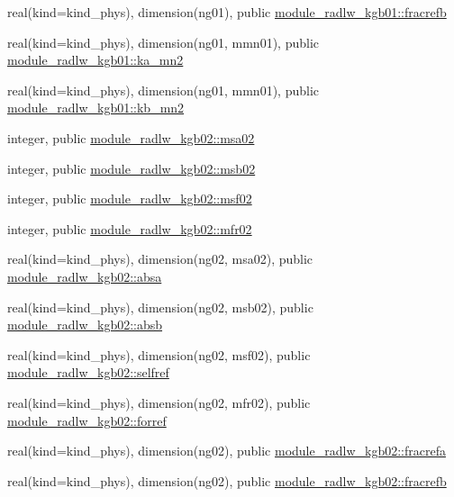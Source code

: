 \begin{DoxyCompactItemize}
\item 
real(kind=kind\+\_\+phys), dimension(ng01), public \hyperlink{group__module__radlw__main_ga19b6a3893965817e82c77bee1de536cd}{module\+\_\+radlw\+\_\+kgb01\+::fracrefb}
\item 
real(kind=kind\+\_\+phys), dimension(ng01, mmn01), public \hyperlink{group__module__radlw__main_ga0a4f08c625f2f25f132200811af42331}{module\+\_\+radlw\+\_\+kgb01\+::ka\+\_\+mn2}
\item 
real(kind=kind\+\_\+phys), dimension(ng01, mmn01), public \hyperlink{group__module__radlw__main_gac357df5f66a7e384e22db58203ac294a}{module\+\_\+radlw\+\_\+kgb01\+::kb\+\_\+mn2}
\item 
integer, public \hyperlink{namespacemodule__radlw__kgb02_a370b514d7834ac2a22d245f118882bf4}{module\+\_\+radlw\+\_\+kgb02\+::msa02}
\item 
integer, public \hyperlink{group__module__radlw__main_ga03e70b84fd16795104a3fb7b425af70c}{module\+\_\+radlw\+\_\+kgb02\+::msb02}
\item 
integer, public \hyperlink{group__module__radlw__main_ga99b728d38d664afc203303563541ab5c}{module\+\_\+radlw\+\_\+kgb02\+::msf02}
\item 
integer, public \hyperlink{group__module__radlw__main_ga2973c2e9220e85b74f0b251c896aa837}{module\+\_\+radlw\+\_\+kgb02\+::mfr02}
\item 
real(kind=kind\+\_\+phys), dimension(ng02, msa02), public \hyperlink{group__module__radlw__main_ga46db893d4456b2d867130bb208cb2206}{module\+\_\+radlw\+\_\+kgb02\+::absa}
\item 
real(kind=kind\+\_\+phys), dimension(ng02, msb02), public \hyperlink{group__module__radlw__main_gacf34f9255586c9ed5ac5370db5b63c14}{module\+\_\+radlw\+\_\+kgb02\+::absb}
\item 
real(kind=kind\+\_\+phys), dimension(ng02, msf02), public \hyperlink{group__module__radlw__main_gaddb071e93b4ff49ba1f1c4d102e275f1}{module\+\_\+radlw\+\_\+kgb02\+::selfref}
\item 
real(kind=kind\+\_\+phys), dimension(ng02, mfr02), public \hyperlink{group__module__radlw__main_gaf6f3d7a0ab6858eab9d4d3e2d2d68031}{module\+\_\+radlw\+\_\+kgb02\+::forref}
\item 
real(kind=kind\+\_\+phys), dimension(ng02), public \hyperlink{group__module__radlw__main_gaf6db1580bd4a8b037cdd3e14765e2c83}{module\+\_\+radlw\+\_\+kgb02\+::fracrefa}
\item 
real(kind=kind\+\_\+phys), dimension(ng02), public \hyperlink{group__module__radlw__main_gaeedda30c8d2bd7c9e7124c6445c8c20e}{module\+\_\+radlw\+\_\+kgb02\+::fracrefb}

\end{DoxyCompactItemize}
